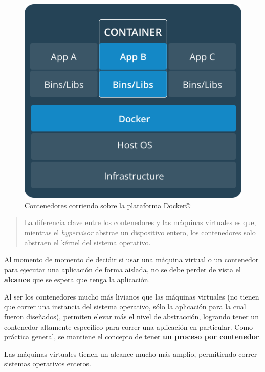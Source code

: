 \documentclass[14pt]{extarticle}
\newcommand{\docker}{Docker\copyright}
\begin{document}
        \begin{figure}
            \includegraphics[scale=0.30]{containers.png}
            \caption{Contenedores corriendo sobre la plataforma \docker{}}
        \end{figure}

        \begin{quote}
            La diferencia clave entre los contenedores y las máquinas virtuales es que, mientras el \textit{hypervisor} abstrae un dispositivo entero, los contenedores solo abstraen el kérnel del sistema operativo. \cite{dockerdarnpopular}
        \end{quote}

        Al momento de momento de decidir si usar una máquina virtual o un contenedor para ejecutar una aplicación de forma aislada, no se debe perder de vista el \textbf{alcance} que se espera que tenga la aplicación.\cite{cloudinfrastructure}

        Al ser los contenedores mucho más livianos que las máquinas virtuales (no tienen que correr una instancia del sistema operativo, sólo la aplicación para la cual fueron diseñados), permiten elevar más el nivel de abstracción, logrando tener un contenedor altamente específico para correr una aplicación en particular.  Como práctica general, se mantiene el concepto de tener \textbf{un proceso por contenedor}.

        Las máquinas virtuales tienen un alcance mucho más amplio, permitiendo correr sistemas operativos enteros.  
\end{document}
